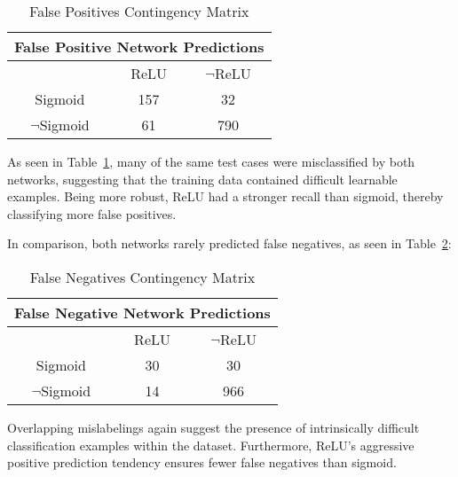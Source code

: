 \documentclass{article}
\theoremstyle{definition}
\begin{document}

\begin{table}[H]
    \centering
    \begin{tabular}{|c|c|c|}
        \hline
        \multicolumn{3}{|c|}{False Positive Network Predictions} \\
        \hline
         & ReLU & $\neg$ReLU \\
        \hline
        Sigmoid & 157 & 32 \\
        \hline
        $\neg$Sigmoid & 61 & 790 \\
        \hline
    \end{tabular}
    \caption{False Positives Contingency Matrix}
    \label{tab:fp_matrix}
\end{table}

As seen in Table~\ref{tab:fp_matrix}, many of the same test cases were misclassified by both networks, suggesting that the training data contained difficult learnable examples. Being more robust, ReLU had a stronger recall than sigmoid, thereby classifying more false positives.

In comparison, both networks rarely predicted false negatives, as seen in Table~\ref{tab:fn_matrix}: 
\begin{table}[H]
    \centering
    \begin{tabular}{|c|c|c|}
        \hline
        \multicolumn{3}{|c|}{False Negative Network Predictions} \\
        \hline
         & ReLU & $\neg$ReLU \\
        \hline
        Sigmoid & 30 & 30 \\
        \hline
        $\neg$Sigmoid & 14 & 966 \\
        \hline
    \end{tabular}
    \caption{False Negatives Contingency Matrix}
    \label{tab:fn_matrix}
\end{table}
Overlapping mislabelings again suggest the presence of intrinsically difficult classification examples within the dataset. Furthermore, ReLU's aggressive positive prediction tendency ensures fewer false negatives than sigmoid.
\end{document}
